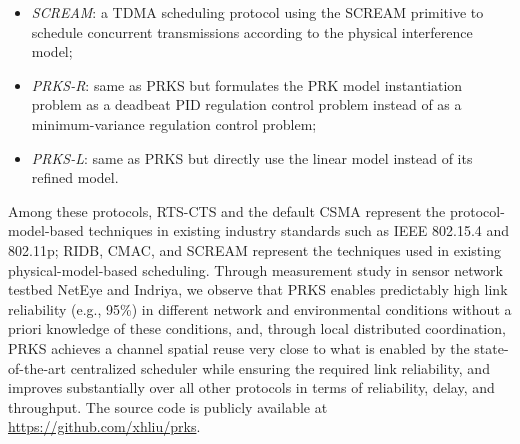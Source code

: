 {\begin{itemize}
\item \emph{SCREAM}: a TDMA scheduling protocol using the SCREAM primitive to schedule concurrent transmissions according to the physical interference model;
\item \emph{PRKS-R}: same as PRKS but formulates the PRK model instantiation problem as a deadbeat PID regulation control problem instead of as a minimum-variance regulation control problem;
\item \emph{PRKS-L}: same as PRKS but directly use the linear model instead of its refined model.
\end{itemize}
Among these protocols, RTS-CTS and the default CSMA represent the protocol-model-based techniques in existing industry standards such as IEEE 802.15.4 and 802.11p; RIDB, CMAC, and SCREAM represent the techniques used in existing physical-model-based scheduling. 
Through measurement study in sensor network testbed NetEye and Indriya, we observe that PRKS enables predictably high link reliability (e.g., 95\%) in different network and environmental conditions without a priori knowledge of these conditions, and, through local distributed coordination, PRKS achieves a channel spatial reuse very close to what is enabled by the state-of-the-art centralized scheduler while ensuring the required link reliability, and improves substantially over all other protocols in terms of reliability, delay, and throughput.
The source code is publicly available at \url{https://github.com/xhliu/prks}.
}

